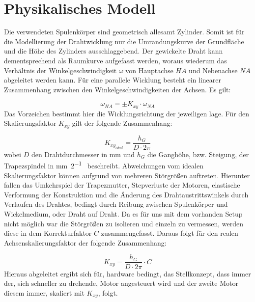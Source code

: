 \section{Physikalisches Modell}
\label{sec:Physikalisches Modell}


Die verwendeten Spulenkörper sind geometrisch allesamt Zylinder. Somit ist für die Modellierung der Drahtwicklung nur die Umrandungskurve der Grundfläche und die Höhe des Zylinders ausschlaggebend. Der gewickelte Draht kann dementsprechend als Raumkurve aufgefasst werden, woraus wiederum das Verhältnis der Winkelgeschwindigkeit $\omega$ von Hauptachse $HA$ und Nebenachse $NA$ abgeleitet werden kann. Für eine parallele Wicklung besteht ein linearer Zusammenhang zwischen den Winkelgeschwindigkeiten der Achsen. Es gilt:

\begin{equation}
    \omega_{HA} = \pm K_{xy} \cdot \omega_{NA}
\end{equation}
Das Vorzeichen bestimmt hier die Wicklungsrichtung der jeweiligen lage. Für den Skalierungsfaktor $K_{xy}$ gilt der folgende Zusammenhang:

\begin{equation}
    \label{eq:achsenskalierungsfaktor}
    K_{xy_{ideal}} = \frac{h_G}{D \cdot 2\pi} 
\end{equation}
wobei $D$ den Drahtdurchmesser in \si{\milli\metre} und $h_G$ die Ganghöhe, bzw. Steigung, der Trapezspindel in \si{\milli\metre\per 2\pi} beschreibt. Abweichungen vom idealen Skalierungsfaktor können aufgrund von mehreren Störgrößen auftreten. Hierunter fallen das Umkehrspiel der Trapezmutter, Stepverluste der Motoren, elastische Verformung der Konstruktion und die Änderung des Drahtaustrittswinkels durch Verlaufen des Drahtes, bedingt durch Reibung zwischen Spulenkörper und Wickelmedium, oder Draht auf Draht. Da es für uns mit dem vorhanden Setup nicht möglich war die Störgrößen zu isolieren und einzeln zu vermessen, werden diese in dem Korrekturfaktor $C$ zusammengefasst. Daraus folgt für den realen Achsenskalierungsfaktor der folgende Zusammenhang:

\begin{equation}
    \label{eq:achsenskalierungsfaktor_real}
    K_{xy} = \frac{h_G}{D \cdot 2\pi} \cdot C
\end{equation}
Hieraus abgeleitet ergibt sich für, hardware bedingt, das Stellkonzept, dass immer der, sich schneller zu drehende, Motor angesteuert wird und der zweite Motor diesem immer, skaliert mit $K_{xy}$, folgt.


